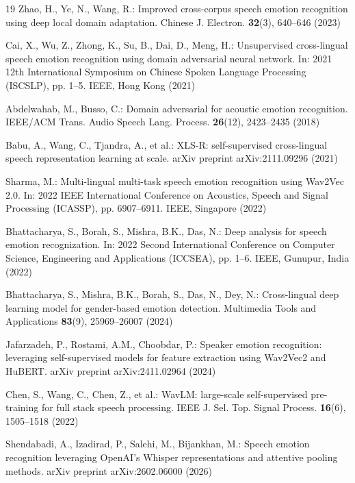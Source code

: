 \documentclass[runningheads]{llncs}
\begin{document}
\begin{thebibliography}{19}
Zhao, H., Ye, N., Wang, R.: Improved cross-corpus speech emotion recognition using deep local domain adaptation. Chinese J. Electron. \textbf{32}(3), 640--646 (2023)

Cai, X., Wu, Z., Zhong, K., Su, B., Dai, D., Meng, H.: Unsupervised cross-lingual speech emotion recognition using domain adversarial neural network. In: 2021 12th International Symposium on Chinese Spoken Language Processing (ISCSLP), pp. 1--5. IEEE, Hong Kong (2021)

Abdelwahab, M., Busso, C.: Domain adversarial for acoustic emotion recognition. IEEE/ACM Trans. Audio Speech Lang. Process. \textbf{26}(12), 2423--2435 (2018)

Babu, A., Wang, C., Tjandra, A., et al.: XLS-R: self-supervised cross-lingual speech representation learning at scale. arXiv preprint arXiv:2111.09296 (2021)

Sharma, M.: Multi-lingual multi-task speech emotion recognition using Wav2Vec 2.0. In: 2022 IEEE International Conference on Acoustics, Speech and Signal Processing (ICASSP), pp. 6907--6911. IEEE, Singapore (2022)

Bhattacharya, S., Borah, S., Mishra, B.K., Das, N.: Deep analysis for speech emotion recognization. In: 2022 Second International Conference on Computer Science, Engineering and Applications (ICCSEA), pp. 1--6. IEEE, Gunupur, India (2022)

Bhattacharya, S., Mishra, B.K., Borah, S., Das, N., Dey, N.: Cross-lingual deep learning model for gender-based emotion detection. Multimedia Tools and Applications \textbf{83}(9), 25969--26007 (2024)

Jafarzadeh, P., Rostami, A.M., Choobdar, P.: Speaker emotion recognition: leveraging self-supervised models for feature extraction using Wav2Vec2 and HuBERT. arXiv preprint arXiv:2411.02964 (2024)

Chen, S., Wang, C., Chen, Z., et al.: WavLM: large-scale self-supervised pre-training for full stack speech processing. IEEE J. Sel. Top. Signal Process. \textbf{16}(6), 1505--1518 (2022)

Shendabadi, A., Izadirad, P., Salehi, M., Bijankhan, M.: Speech emotion recognition leveraging OpenAI's Whisper representations and attentive pooling methods. arXiv preprint arXiv:2602.06000 (2026)

\end{thebibliography}
\end{document}
